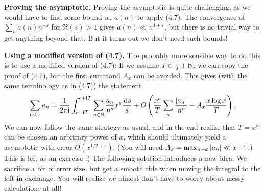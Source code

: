 \documentclass[a4paper,11pt]{article}
\begin{document}
\textbf{Proving the asymptotic.}
Proving the asymptotic is
quite challenging, as we would have to find some bound on $a(n)$ to apply (4.7).
The convergence of $\sum_n a(n)n^{-s}$ for $\Re (s)>1$ gives $a(n) \ll
n^{1+\varepsilon}$, but 
there is no trivial way to get anything beyond that.
But it turns out we don't need such bounds! 

\textbf{Using a modified version of (4.7).} The probably more sensible way to
do this is to use a modified version of 
(4.7): If we assume $x \in \frac 12 + \mathbb{N}$, we can copy the proof of (4.7), but 
the first summand $A_x$ can be avoided. This gives (with the same terminology as in 
(4.7)) the statement
\[
    \sum_{n \leq x} a_n = \frac{1}{2 \pi \mathrm i} \int_{c-\mathrm i T}^{c + \mathrm i T} \sum_{n \in
        \mathbb{N}}\frac{a_n}{n^s} x^{s} \frac {\mathrm{\,d} s}s + O\left(\frac{x^c}T \sum_n
            \frac{\left\lvert a_n \right\rvert}{n^c} + 
    A_x \frac{x \log x}T\right).
\]
We can now follow the same strategy as usual, and in the end realize
that $T = x^\alpha$ can be chosen an arbitrary power of $x$, which 
should ultimately yield a asymptotic with error $O(x^{1/2+\varepsilon})$.
(You will need $A_x = \max_{n \sim x} \left\lvert a_n \right\rvert \ll x^{1+\varepsilon}$.) This
is left as an exercise :) The following solution introduces a new idea. We 
sacrifice a bit of error size, but get a smooth ride when moving the integral to 
the left in exchange. You will realize we almost don't have to worry about
messy calculations at all! 
\end{document}
